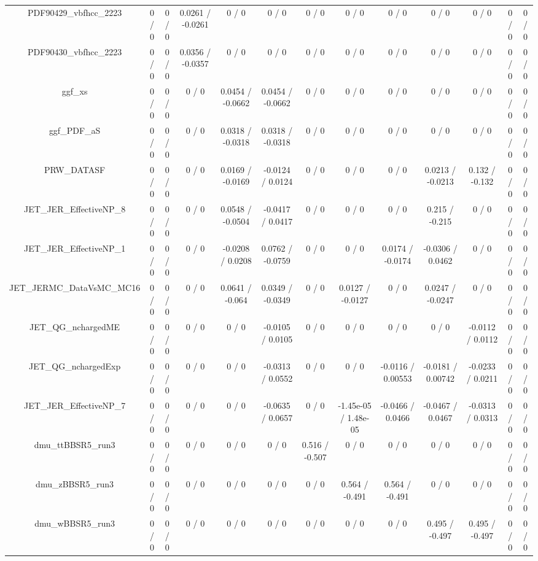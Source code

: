 \documentclass[10pt]{article}
\begin{document}
\begin{table}[htbp]
\begin{center}
\begin{tabular}{|c|c|c|c|c|c|c|c|c|c|c|c|c|}
  PDF90429_vbfhcc_2223 & 0 / 0 & 0 / 0 & 0.0261 / -0.0261 & 0 / 0 & 0 / 0 & 0 / 0 & 0 / 0 & 0 / 0 & 0 / 0 & 0 / 0 & 0 / 0 & 0 / 0 \\ 
  PDF90430_vbfhcc_2223 & 0 / 0 & 0 / 0 & 0.0356 / -0.0357 & 0 / 0 & 0 / 0 & 0 / 0 & 0 / 0 & 0 / 0 & 0 / 0 & 0 / 0 & 0 / 0 & 0 / 0 \\ 
  ggf_xs & 0 / 0 & 0 / 0 & 0 / 0 & 0.0454 / -0.0662 & 0.0454 / -0.0662 & 0 / 0 & 0 / 0 & 0 / 0 & 0 / 0 & 0 / 0 & 0 / 0 & 0 / 0 \\ 
  ggf_PDF_aS & 0 / 0 & 0 / 0 & 0 / 0 & 0.0318 / -0.0318 & 0.0318 / -0.0318 & 0 / 0 & 0 / 0 & 0 / 0 & 0 / 0 & 0 / 0 & 0 / 0 & 0 / 0 \\ 
  PRW_DATASF & 0 / 0 & 0 / 0 & 0 / 0 & 0.0169 / -0.0169 & -0.0124 / 0.0124 & 0 / 0 & 0 / 0 & 0 / 0 & 0.0213 / -0.0213 & 0.132 / -0.132 & 0 / 0 & 0 / 0 \\ 
  JET_JER_EffectiveNP_8 & 0 / 0 & 0 / 0 & 0 / 0 & 0.0548 / -0.0504 & -0.0417 / 0.0417 & 0 / 0 & 0 / 0 & 0 / 0 & 0.215 / -0.215 & 0 / 0 & 0 / 0 & 0 / 0 \\ 
  JET_JER_EffectiveNP_1 & 0 / 0 & 0 / 0 & 0 / 0 & -0.0208 / 0.0208 & 0.0762 / -0.0759 & 0 / 0 & 0 / 0 & 0.0174 / -0.0174 & -0.0306 / 0.0462 & 0 / 0 & 0 / 0 & 0 / 0 \\ 
  JET_JERMC_DataVsMC_MC16 & 0 / 0 & 0 / 0 & 0 / 0 & 0.0641 / -0.064 & 0.0349 / -0.0349 & 0 / 0 & 0.0127 / -0.0127 & 0 / 0 & 0.0247 / -0.0247 & 0 / 0 & 0 / 0 & 0 / 0 \\ 
  JET_QG_nchargedME & 0 / 0 & 0 / 0 & 0 / 0 & 0 / 0 & -0.0105 / 0.0105 & 0 / 0 & 0 / 0 & 0 / 0 & 0 / 0 & -0.0112 / 0.0112 & 0 / 0 & 0 / 0 \\ 
  JET_QG_nchargedExp & 0 / 0 & 0 / 0 & 0 / 0 & 0 / 0 & -0.0313 / 0.0552 & 0 / 0 & 0 / 0 & -0.0116 / 0.00553 & -0.0181 / 0.00742 & -0.0233 / 0.0211 & 0 / 0 & 0 / 0 \\ 
  JET_JER_EffectiveNP_7 & 0 / 0 & 0 / 0 & 0 / 0 & 0 / 0 & -0.0635 / 0.0657 & 0 / 0 & -1.45e-05 / 1.48e-05 & -0.0466 / 0.0466 & -0.0467 / 0.0467 & -0.0313 / 0.0313 & 0 / 0 & 0 / 0 \\ 
  dmu_ttBBSR5_run3 & 0 / 0 & 0 / 0 & 0 / 0 & 0 / 0 & 0 / 0 & 0.516 / -0.507 & 0 / 0 & 0 / 0 & 0 / 0 & 0 / 0 & 0 / 0 & 0 / 0 \\ 
  dmu_zBBSR5_run3 & 0 / 0 & 0 / 0 & 0 / 0 & 0 / 0 & 0 / 0 & 0 / 0 & 0.564 / -0.491 & 0.564 / -0.491 & 0 / 0 & 0 / 0 & 0 / 0 & 0 / 0 \\ 
  dmu_wBBSR5_run3 & 0 / 0 & 0 / 0 & 0 / 0 & 0 / 0 & 0 / 0 & 0 / 0 & 0 / 0 & 0 / 0 & 0.495 / -0.497 & 0.495 / -0.497 & 0 / 0 & 0 / 0 \\ 

\end{tabular}
\end{center}
\end{table}
\end{document}
